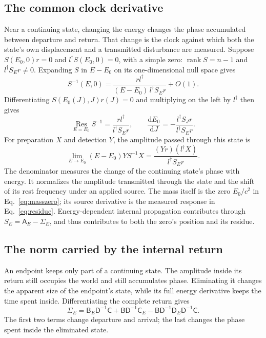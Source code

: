 \documentclass[aps,prx,onecolumn,10pt,notitlepage,nofootinbib,longbibliography]{revtex4-2}
\numberwithin{equation}{section}
\numberwithin{table}{section}
\newcommand{\rank}{\operatorname{rank}}
\newcommand{\dd}{\mathrm d}
\begin{document}
\subsection{The common clock derivative}
Near a continuing state, changing the energy changes the phase accumulated between departure and return. That change is the clock against which both the state's own displacement and a transmitted disturbance are measured. Suppose $S(E_0,0)r=0$ and $l^\dagger S(E_0,0)=0$, with a simple zero: $\rank S=n-1$ and $l^\dagger S_Er\ne0$. Expanding $S$ in $E-E_0$ on its one-dimensional null space gives
\begin{equation}
 S^{-1}(E,0)=\frac{rl^\dagger}{(E-E_0)\,l^\dagger S_Er}+O(1).
\end{equation}
Differentiating $S(E_0(J),J)r(J)=0$ and multiplying on the left by $l^\dagger$ then gives
\begin{equation}
 \operatorname*{Res}_{E=E_0}S^{-1}
 =\frac{rl^\dagger}{l^\dagger S_Er},\qquad
 \frac{\dd E_0}{\dd J}
 =-\frac{l^\dagger S_Jr}{l^\dagger S_Er}.
 \label{eq:residue}
\end{equation}
For preparation $X$ and detection $Y$, the amplitude passed through this state is
\begin{equation}
 \lim_{E\to E_0}(E-E_0)YS^{-1}X
 =\frac{(Yr)(l^\dagger X)}{l^\dagger S_Er}.
 \label{eq:sharedamplitude}
\end{equation}
The denominator measures the change of the continuing state's phase with energy. It normalizes the amplitude transmitted through the state and the shift of its rest frequency under an applied source. The mass itself is the zero $E_0/c^2$ in Eq.~\eqref{eq:masszero}; its source derivative is the measured response in Eq.~\eqref{eq:residue}. Energy-dependent internal propagation contributes through $S_E={\mathsf A}_E-\Sigma_E$, and thus contributes to both the zero's position and its residue.

\subsection{The norm carried by the internal return}
\label{sec:restnecessity}

An endpoint keeps only part of a continuing state. The amplitude inside its return still occupies the world and still accumulates phase. Eliminating it changes the apparent size of the endpoint's state, while its full energy derivative keeps the time spent inside. Differentiating the complete return gives
\begin{equation}
 \Sigma_E={\mathsf B}_E{\mathsf D}^{-1}{\mathsf C}+{\mathsf B}{\mathsf D}^{-1}{\mathsf C}_E-{\mathsf B}{\mathsf D}^{-1}{\mathsf D}_E{\mathsf D}^{-1}{\mathsf C}.
 \label{eq:selfenergyderivative}
\end{equation}
The first two terms change departure and arrival; the last changes the phase spent inside the eliminated state.
\end{document}
